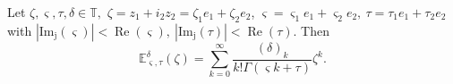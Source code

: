 \documentclass[10pt,a4paper]{amsart}
\begin{document}
\begin{theorem}\label{th: ml}
Let $\zeta,  \varsigma,\tau, \delta\in \mathbb{T},$ 
$\zeta= z_1+i_2z_2= \zeta_1e_1+\zeta_2e_2$, $ \varsigma=  \varsigma_1e_1+ \varsigma_2e_2,  ~ \tau=\tau_1e_1+\tau_2e_2$ with $|\operatorname{Im_j}( \varsigma)|<\operatorname{Re}( \varsigma),~|\operatorname{Im_j}(\tau)|<\operatorname{Re}(\tau).$ 
Then
\begin{equation}
\mathbb{E}_{ \varsigma,\tau}^\delta(\zeta)=\sum_{k=0}^{\infty}\frac{(\delta)_k}{k!\Gamma( \varsigma k+\tau )}\zeta^k.  \end{equation}
\end{theorem}
\end{document}
